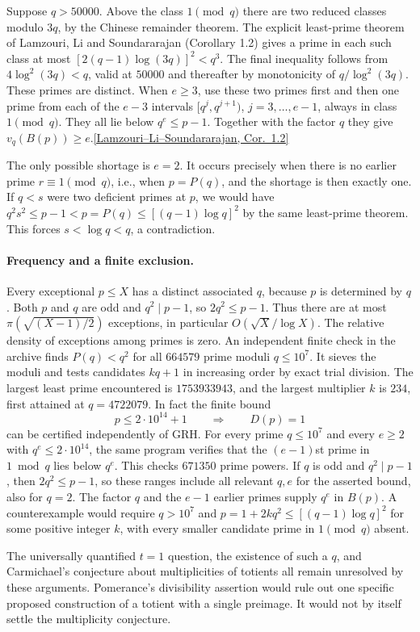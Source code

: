 Suppose $q>50000$. Above the class $1\pmod q$ there are two reduced
classes modulo $3q$, by the Chinese remainder theorem. The explicit
least-prime theorem of Lamzouri, Li and Soundararajan (Corollary 1.2)
gives a prime in each such class at most
$[2(q-1)\log(3q)]^2<q^3$. The final inequality follows from
$4\log^2(3q)<q$, valid at $50000$ and thereafter by monotonicity of
$q/\log^2(3q)$. These primes are distinct. When $e\ge3$, use these two
primes first and then one prime from each of the $e-3$ intervals
$[q^j,q^{j+1})$, $j=3,\ldots,e-1$, always in class $1\pmod q$.
They all lie below $q^e\le p-1$. Together with the factor $q$ they give
$v_q(B(p))\ge e$.\hfill\href{https://arxiv.org/pdf/1309.3595}{[Lamzouri--Li--Soundararajan, Cor.~1.2]}

The only possible shortage is $e=2$. It occurs precisely when there
is no earlier prime $r\equiv1\pmod q$, i.e., when $p=P(q)$, and the
shortage is then exactly one. If $q<s$ were two deficient primes at
$p$, we would have
$q^2s^2\le p-1<p=P(q)\le[(q-1)\log q]^2$ by the same
least-prime theorem. This forces $s<\log q<q$, a contradiction.

\paragraph{Frequency and a finite exclusion.}
Every exceptional $p\le X$ has a distinct associated $q$, because $p$
is determined by $q$. Both $p$ and $q$ are odd and $q^2\mid p-1$,
so $2q^2\le p-1$. Thus there are at most
$\pi(\sqrt{(X-1)/2})$ exceptions, in particular
$O(\sqrt X/\log X)$. The relative density of exceptions among primes
is zero. An independent finite check in the archive finds $P(q)<q^2$
for all $664579$ prime moduli $q\le10^7$. It sieves the moduli and
tests candidates $kq+1$ in increasing order by exact trial division.
The largest least prime encountered is $1753933943$, and the largest
multiplier $k$ is $234$, first attained at $q=4722079$. In fact the finite bound
\[
 p\le 2\cdot10^{14}+1\qquad\Longrightarrow\qquad D(p)=1
\]
can be certified independently of GRH. For every prime $q\le10^7$ and every
$e\ge2$ with $q^e\le2\cdot10^{14}$, the same program verifies that the
$(e-1)$st prime in $1\bmod q$ lies below $q^e$. This checks $671350$
prime powers. If $q$ is odd and $q^2\mid p-1$, then $2q^2\le p-1$,
so these ranges include all relevant $q,e$ for the asserted bound, also
for $q=2$. The factor $q$ and the $e-1$ earlier primes supply $q^e$
in $B(p)$. A counterexample would require $q>10^7$ and
$p=1+2kq^2\le[(q-1)\log q]^2$ for some positive integer $k$,
with every smaller candidate prime in $1\pmod q$ absent.

The universally quantified $t=1$ question, the existence of such a $q$,
and Carmichael's conjecture about multiplicities of totients all remain
unresolved by these arguments. Pomerance's divisibility assertion would
rule out one specific proposed construction of a totient with a single
preimage. It would not by itself settle the multiplicity conjecture.
